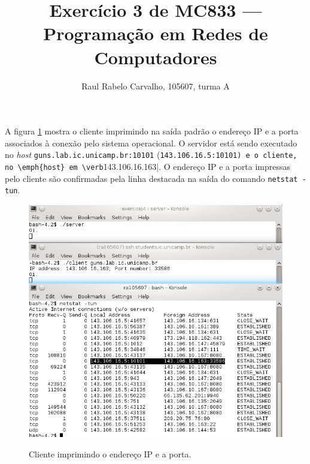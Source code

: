 \documentclass[a4paper,10pt,oneside,final,titlepage,onecolumn]{article}
\title{Exercício 3 de MC833 --- Programação em Redes de Computadores}
\author{Raul Rabelo Carvalho, 105607, turma A}
\begin{document}
\maketitle



\section{}
\paragraph{}A figura \ref{print-ipport-client} mostra o cliente imprimindo na saída padrão o endereço IP e a porta associados à conexão pelo sistema operacional. O servidor está sendo executado no \emph{host} \verb|guns.lab.ic.unicamp.br:10101| (\verb|143.106.16.5:10101) e o cliente, no \emph{host} em \verb|143.106.16.163|. O endereço IP e a porta impressas pelo cliente são confirmadas pela linha destacada na saída do comando \verb|netstat -tun|.
\begin{figure}[!ht]
  \caption{Cliente imprimindo o endereço IP e a porta.}
  \centering
  \includegraphics[width=117mm]{images/print-ipport-client.png}
  \label{print-ipport-client}
\end{figure}



\FloatBarrier
\section{}
\end{document}

